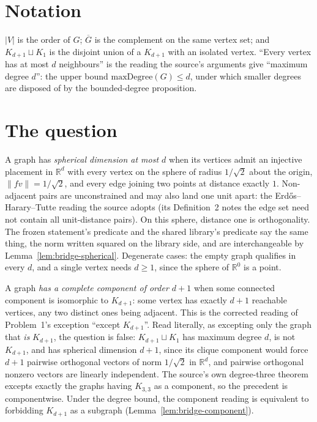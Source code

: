 \section{Notation}

$|V|$ is the order of $G$; $\overline{G}$ is the complement on the same vertex set; and
$K_{d+1} \sqcup K_1$ is the disjoint union of a $K_{d+1}$ with an isolated vertex.
``Every vertex has at most $d$ neighbours'' is the reading the source's arguments give
``maximum degree $d$'': the upper bound $\mathrm{maxDegree}(G) \le d$, under which smaller
degrees are disposed of by the bounded-degree proposition.

\section{The question}

\begin{definition}
  \label{def:spherical}
  \leanok
  A graph has \emph{spherical dimension at most $d$} when its vertices admit an injective
  placement in $\mathbb{R}^d$ with every vertex on the sphere of radius $1/\sqrt2$ about the
  origin, $\|f v\| = 1/\sqrt2$, and every edge joining two points at distance exactly $1$.
  Non-adjacent pairs are unconstrained and may also land one unit apart: the
  Erd\H{o}s--Harary--Tutte reading the source adopts (its Definition~2 notes the edge set
  need not contain all unit-distance pairs). On this sphere, distance one is orthogonality.
  The frozen statement's predicate and the shared library's predicate say the same thing,
  the norm written squared on the library side, and are interchangeable by
  Lemma~\ref{lem:bridge-spherical}. Degenerate cases: the empty graph qualifies in every
  $d$, and a single vertex needs $d \ge 1$, since the sphere of $\mathbb{R}^0$ is a point.
\end{definition}

\begin{definition}
  \label{def:exception}
  \leanok
  A graph \emph{has a complete component of order $d+1$} when some connected component is
  isomorphic to $K_{d+1}$: some vertex has exactly $d+1$ reachable vertices, any two
  distinct ones being adjacent. This is the corrected reading of Problem~1's exception
  ``except $K_{d+1}$''. Read literally, as excepting only the graph that \emph{is}
  $K_{d+1}$, the question is false: $K_{d+1} \sqcup K_1$ has maximum degree $d$, is not
  $K_{d+1}$, and has spherical dimension $d + 1$, since its clique component would force
  $d + 1$ pairwise orthogonal vectors of norm $1/\sqrt2$ in $\mathbb{R}^d$, and pairwise
  orthogonal nonzero vectors are linearly independent. The source's own degree-three
  theorem excepts exactly the graphs having $K_{3,3}$ as a component, so the precedent is
  componentwise. Under the degree bound, the component reading is equivalent to forbidding
  $K_{d+1}$ as a subgraph (Lemma~\ref{lem:bridge-component}).
\end{definition}

